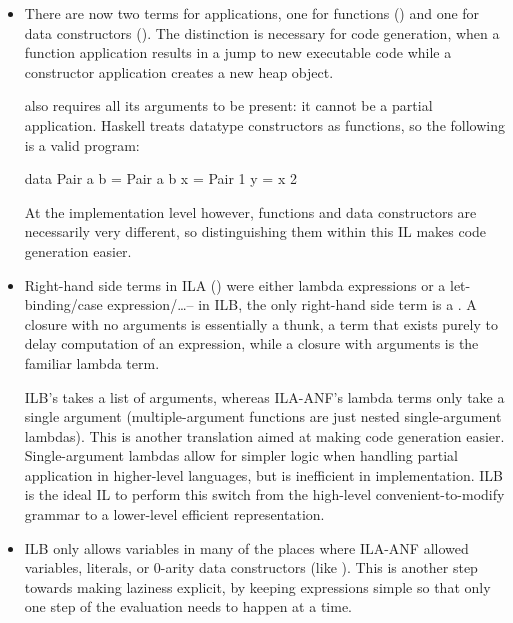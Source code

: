 \documentclass[dissertation.tex]{subfiles}
\begin{document}
{{        \begin{itemize}
        \item
        {
            There are now two terms for applications, one for functions () and one for data constructors (). The distinction is necessary for code generation, when a function application results in a jump to new executable code while a constructor application creates a new heap object. 

             also requires all its arguments to be present: it cannot be a partial application.
            Haskell treats datatype constructors as functions, so the following is a valid program:

            \begin{haskellfigure}
            data Pair a b = Pair a b
            x = Pair 1
            y = x 2
            \end{haskellfigure}

            At the implementation level however, functions and data constructors are necessarily very different, so distinguishing them within this IL makes code generation easier.
        }
        \item
        {
            Right-hand side terms in ILA () were either lambda expressions or a let-binding/case expression/\dots -- in ILB, the only right-hand side term is a . A closure with no arguments is essentially a thunk, a term that exists purely to delay computation of an expression, while a closure with arguments is the familiar lambda term.

            ILB's  takes a list of arguments, whereas ILA-ANF's lambda terms only take a single argument (multiple-argument functions are just nested single-argument lambdas). This is another translation aimed at making code generation easier. Single-argument lambdas allow for simpler logic when handling partial application in higher-level languages, but is inefficient in implementation. ILB is the ideal IL to perform this switch from the high-level convenient-to-modify grammar to a lower-level efficient representation.
        }
        \item
        {
            ILB only allows variables in many of the places where ILA-ANF allowed variables, literals, or 0-arity data constructors (like ). This is another step towards making laziness explicit, by keeping expressions simple so that only one step of the evaluation needs to happen at a time.
        }
        \end{itemize}
    }
}
\end{document}
